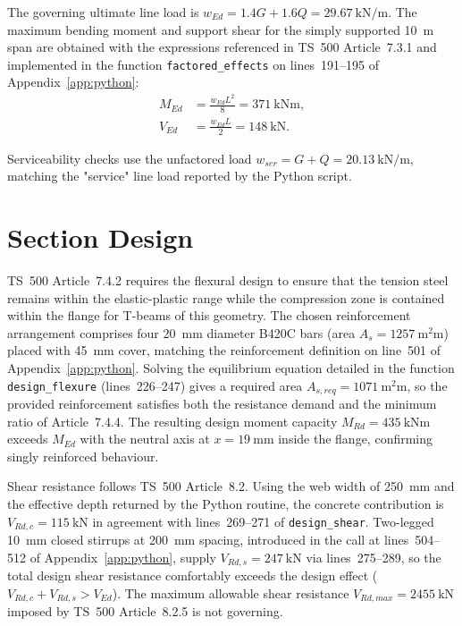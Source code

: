 \documentclass[12pt,a4paper]{report}
\newenvironment{calculation}{\begin{equation}\begin{aligned}}{\end{aligned}\end{equation}}
\begin{document}
The governing ultimate line load is $w_{Ed} = 1.4G + 1.6Q = \SI{29.67}{\kilo\newton\per\meter}$. The maximum bending moment and support shear for the simply supported \SI{10}{\meter} span are obtained with the expressions referenced in TS~500 Article~7.3.1 and implemented in the function \texttt{factored\_effects} on lines~191--195 of Appendix~\ref{app:python}:
\begin{calculation}
M_{Ed} &= \frac{w_{Ed} L^2}{8} = \SI{371}{\kilo\newton\meter},\\
V_{Ed} &= \frac{w_{Ed} L}{2} = \SI{148}{\kilo\newton}.
\end{calculation}

Serviceability checks use the unfactored load $w_{ser} = G + Q = \SI{20.13}{\kilo\newton\per\meter}$, matching the "service" line load reported by the Python script.

\section{Section Design}
TS~500 Article~7.4.2 requires the flexural design to ensure that the tension steel remains within the elastic-plastic range while the compression zone is contained within the flange for T-beams of this geometry. The chosen reinforcement arrangement comprises four \SI{20}{\milli\meter} diameter B420C bars (area $A_s = \SI{1257}{\square\milli\meter}$) placed with \SI{45}{\milli\meter} cover, matching the reinforcement definition on line~501 of Appendix~\ref{app:python}. Solving the equilibrium equation detailed in the function \texttt{design\_flexure} (lines~226--247) gives a required area $A_{s,req} = \SI{1071}{\square\milli\meter}$, so the provided reinforcement satisfies both the resistance demand and the minimum ratio of Article~7.4.4. The resulting design moment capacity $M_{Rd} = \SI{435}{\kilo\newton\meter}$ exceeds $M_{Ed}$ with the neutral axis at $x = \SI{19}{\milli\meter}$ inside the flange, confirming singly reinforced behaviour.

Shear resistance follows TS~500 Article~8.2. Using the web width of \SI{250}{\milli\meter} and the effective depth returned by the Python routine, the concrete contribution is $V_{Rd,c} = \SI{115}{\kilo\newton}$ in agreement with lines~269--271 of \texttt{design\_shear}. Two-legged \SI{10}{\milli\meter} closed stirrups at \SI{200}{\milli\meter} spacing, introduced in the call at lines~504--512 of Appendix~\ref{app:python}, supply $V_{Rd,s} = \SI{247}{\kilo\newton}$ via lines~275--289, so the total design shear resistance comfortably exceeds the design effect ($V_{Rd,c} + V_{Rd,s} > V_{Ed}$). The maximum allowable shear resistance $V_{Rd,max} = \SI{2455}{\kilo\newton}$ imposed by TS~500 Article~8.2.5 is not governing.
\end{document}
